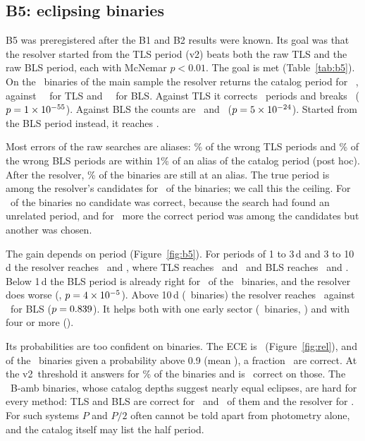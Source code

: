 \documentclass[twocolumn,linenumbers]{aastex701}
\newcommand{\Vtwo}{v2}
\begin{document}
\subsection{B5: eclipsing binaries} \label{sec:b5}

B5 was preregistered after the B1 and B2 results were known. Its goal was that the resolver started from the TLS period (\Vtwo) beats both the raw TLS and the raw BLS period, each with McNemar $p<0.01$. The goal is met (Table~\ref{tab:b5}). On the \bFiveN\ binaries of the main sample the resolver returns the catalog period for \bFiveAcc\ \bFiveAccCI, against \bFiveRawTls\ \bFiveRawTlsCI\ for TLS and \bFiveRawBls\ \bFiveRawBlsCI\ for BLS. Against TLS it corrects \bFiveMcTlsFix\ periods and breaks \bFiveMcTlsBreak\ ($p=1\times10^{-55}$). Against BLS the counts are \bFiveMcBlsFix\ and \bFiveMcBlsBreak\ ($p=5\times10^{-24}$). Started from the BLS period instead, it reaches \bFiveAccBlsSeed.

Most errors of the raw searches are aliases: \bFiveAliasTlsShare\% of the wrong TLS periods and \bFiveAliasBlsShare\% of the wrong BLS periods are within 1\% of an alias of the catalog period (post hoc). After the resolver, \bFiveAliasResPc\% of the binaries are still at an alias. The true period is among the resolver's candidates for \bFiveCeil\ of the binaries; we call this the ceiling. For \bFiveCeilMiss\ of the binaries no candidate was correct, because the search had found an unrelated period, and for \bFiveChoiceErr\ more the correct period was among the candidates but another was chosen.

The gain depends on period (Figure~\ref{fig:b5}). For periods of 1 to 3\,d and 3 to 10\,d the resolver reaches \bFiveOneThreeAcc\ and \bFiveThreeTenAcc, where TLS reaches \bFiveOneThreeTls\ and \bFiveThreeTenTls\ and BLS reaches \bFiveOneThreeBls\ and \bFiveThreeTenBls. Below 1\,d the BLS period is already right for \bFiveShortBls\ of the \bFiveShortN\ binaries, and the resolver does worse (\bFiveShortAcc, $p=4\times10^{-5}$). Above 10\,d (\bFiveLongN\ binaries) the resolver reaches \bFiveLongAcc\ against \bFiveLongBls\ for BLS ($p=0.839$). It helps both with one early sector (\bFiveOneSecN\ binaries, \bFiveOneSecAcc) and with four or more (\bFiveFourSecAcc).

Its probabilities are too confident on binaries. The ECE is \bFiveEce\ (Figure~\ref{fig:rel}), and of the \bFiveTopBinN\ binaries given a probability above 0.9 (mean \bFiveTopBinConf), a fraction \bFiveTopBinAcc\ are correct. At the \Vtwo\ threshold it answers for \bFiveCovered\% of the binaries and is \bFiveNa\ correct on those. The \bFiveAmbN\ B-amb binaries, whose catalog depths suggest nearly equal eclipses, are hard for every method: TLS and BLS are correct for \bFiveAmbTls\ and \bFiveAmbBls\ of them and the resolver for \bFiveAmbAcc. For such systems $P$ and $P/2$ often cannot be told apart from photometry alone, and the catalog itself may list the half period.
\end{document}
